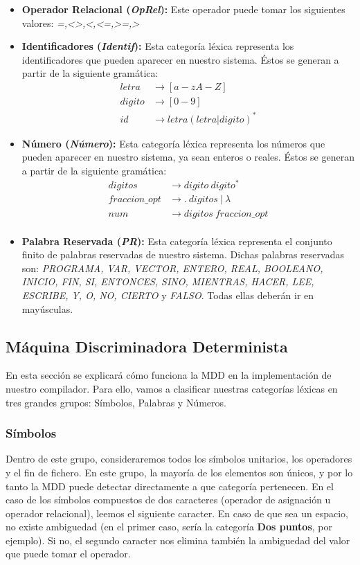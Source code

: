 \documentclass[11pt]{article}
\begin{document}
\begin{itemize}
	\item \textbf{Operador Relacional (\textit{OpRel}): } Este operador puede tomar los siguientes valores: \textit{=,<>,<,<=,>=,>}
	\item \textbf{Identificadores (\textit{Identif}): } Esta categoría léxica representa los identificadores que pueden aparecer en nuestro sistema. Éstos se generan a partir de la siguiente gramática: 
		\begin{align*}
			letra &\rightarrow [a-zA-Z] \\
			digito &\rightarrow [0-9] \\
			id &\rightarrow letra(letra|digito)^*
		\end{align*}
	\item \textbf{Número (\textit{Número}): } Esta categoría léxica representa los números que pueden aparecer en nuestro sistema, ya sean enteros o reales. Éstos se generan a partir de la siguiente gramática: 
		\begin{align*}
			digitos &\rightarrow digito \ digito^* \\
			fraccion\_opt &\rightarrow . \ digitos \ | \ \lambda \\
			num &\rightarrow  digitos \ fraccion\_opt \\
		\end{align*}
	\item \textbf{Palabra Reservada (\textit{PR}): } Esta categoría léxica representa el conjunto finito de palabras reservadas de nuestro sistema. Dichas palabras reservadas son: \textit{PROGRAMA,  VAR,  VECTOR,  ENTERO,  REAL,  BOOLEANO,  INICIO,  FIN,  SI,  ENTONCES, SINO, MIENTRAS, HACER, LEE, ESCRIBE, Y, O, NO, CIERTO} y \textit{FALSO}. Todas ellas deberán ir en mayúsculas.
\end{itemize}
\subsection{Máquina Discriminadora Determinista}
En esta sección se explicará cómo funciona la MDD en la implementación de nuestro compilador. Para ello, vamos a clasificar nuestras categorías léxicas en tres grandes grupos: Símbolos, Palabras y Números.
\subsubsection{Símbolos}
Dentro de este grupo, consideraremos todos los símbolos unitarios, los operadores y el fin de fichero. En este grupo, la mayoría de los elementos son únicos, y por lo tanto la MDD puede detectar directamente a que categoría pertenecen. En el caso de los símbolos compuestos de dos caracteres (operador de asignación u operador relacional), leemos el siguiente caracter. En caso de que sea un espacio, no existe ambiguedad (en el primer caso, sería la categoría \textbf{Dos puntos}, por ejemplo). Si no, el segundo caracter nos elimina también la ambiguedad del valor que puede tomar el operador.
\end{document}
